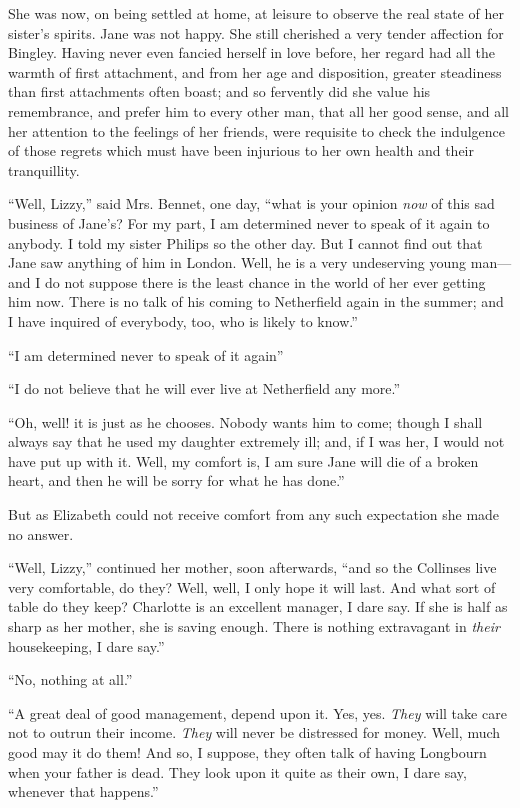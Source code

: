 \documentclass[12pt,openright]{book}
\begin{document}
She was now, on being settled at home, at leisure to observe the real state of her sister’s spirits. Jane was not happy. She still cherished a very tender affection for Bingley. Having never even fancied herself in love before, her regard had all the warmth of first attachment, and from her age and disposition, greater steadiness than first attachments often boast; and so fervently did she value his remembrance, and prefer him to every other man, that all her good sense, and all her attention to the feelings of her friends, were requisite to check the indulgence of those regrets which must have been injurious to her own health and their tranquillity.

“Well, Lizzy,” said Mrs. Bennet, one day, “what is your opinion \textit{now} of this sad business of Jane’s? For my part, I am determined never to speak of it again to anybody. I told my sister Philips so the other day. But I cannot find out that Jane saw anything of him in London. Well, he is a very undeserving young man—and I do not suppose there is the least chance in the world of her ever getting him now. There is no talk of his coming to Netherfield again in the summer; and I have inquired of everybody, too, who is likely to know.”

“I am determined never to speak of it again”

“I do not believe that he will ever live at Netherfield any more.”

“Oh, well! it is just as he chooses. Nobody wants him to come; though I shall always say that he used my daughter extremely ill; and, if I was her, I would not have put up with it. Well, my comfort is, I am sure Jane will die of a broken heart, and then he will be sorry for what he has done.”

But as Elizabeth could not receive comfort from any such expectation she made no answer.

“Well, Lizzy,” continued her mother, soon afterwards, “and so the Collinses live very comfortable, do they? Well, well, I only hope it will last. And what sort of table do they keep? Charlotte is an excellent manager, I dare say. If she is half as sharp as her mother, she is saving enough. There is nothing extravagant in \textit{their} housekeeping, I dare say.”

“No, nothing at all.”

“A great deal of good management, depend upon it. Yes, yes. \textit{They} will take care not to outrun their income. \textit{They} will never be distressed for money. Well, much good may it do them! And so, I suppose, they often talk of having Longbourn when your father is dead. They look upon it quite as their own, I dare say, whenever that happens.”
\end{document}
